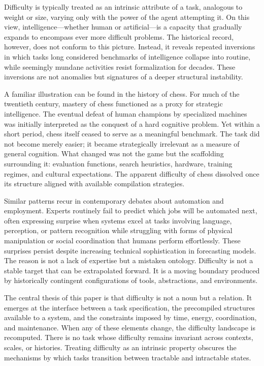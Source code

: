 \documentclass[12pt]{article}
\begin{document}
Difficulty is typically treated as an intrinsic attribute of a task, analogous to weight or size, varying only with the power of the agent attempting it. On this view, intelligence—whether human or artificial—is a capacity that gradually expands to encompass ever more difficult problems. The historical record, however, does not conform to this picture. Instead, it reveals repeated inversions in which tasks long considered benchmarks of intelligence collapse into routine, while seemingly mundane activities resist formalization for decades. These inversions are not anomalies but signatures of a deeper structural instability.

A familiar illustration can be found in the history of chess. For much of the twentieth century, mastery of chess functioned as a proxy for strategic intelligence. The eventual defeat of human champions by specialized machines was initially interpreted as the conquest of a hard cognitive problem. Yet within a short period, chess itself ceased to serve as a meaningful benchmark. The task did not become merely easier; it became strategically irrelevant as a measure of general cognition. What changed was not the game but the scaffolding surrounding it: evaluation functions, search heuristics, hardware, training regimes, and cultural expectations. The apparent difficulty of chess dissolved once its structure aligned with available compilation strategies.

Similar patterns recur in contemporary debates about automation and employment. Experts routinely fail to predict which jobs will be automated next, often expressing surprise when systems excel at tasks involving language, perception, or pattern recognition while struggling with forms of physical manipulation or social coordination that humans perform effortlessly. These surprises persist despite increasing technical sophistication in forecasting models. The reason is not a lack of expertise but a mistaken ontology. Difficulty is not a stable target that can be extrapolated forward. It is a moving boundary produced by historically contingent configurations of tools, abstractions, and environments.

The central thesis of this paper is that difficulty is not a noun but a relation. It emerges at the interface between a task specification, the precompiled structures available to a system, and the constraints imposed by time, energy, coordination, and maintenance. When any of these elements change, the difficulty landscape is recomputed. There is no task whose difficulty remains invariant across contexts, scales, or histories. Treating difficulty as an intrinsic property obscures the mechanisms by which tasks transition between tractable and intractable states.
\end{document}
